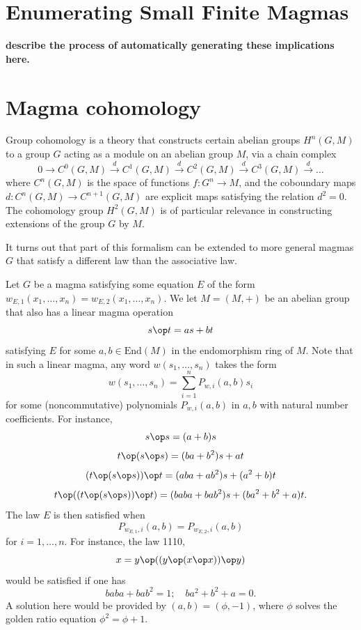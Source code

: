 \chapter{Enumerating Small Finite Magmas}\label{all-small-magmas-chapter}

{\bf describe the process of automatically generating these implications here.}


\chapter{Magma cohomology}\label{cohomology-chapter}

Group cohomology is a theory that constructs certain abelian groups $H^n(G,M)$ to a group $G$ acting as a module on an abelian group $M$, via a chain complex
$$ 0 \to C^0(G,M) \stackrel{d}{\to} C^1(G,M) \stackrel{d}{\to} C^2(G,M) \stackrel{d}{\to} C^3(G,M) \stackrel{d}{\to} \dots$$
where $C^n(G,M)$ is the space of functions $f: G^n \to M$, and the coboundary maps $d: C^n(G,M) \to C^{n+1}(G,M)$ are explicit maps satisfying the relation $d^2=0$.  The cohomology group $H^2(G,M)$ is of particular relevance in constructing extensions of the group $G$ by $M$.

It turns out that part of this formalism can be extended to more general magmas $G$ that satisfy a different law than the associative law.

Let $G$ be a magma satisfying some equation $E$ of the form $w_{E,1}(x_1,\dots,x_n) = w_{E,2}(x_1,\dots,x_n)$.  We let $M = (M,+)$ be an abelian group that also has a linear magma operation
$$ s \op t = as + bt$$
satisfying $E$ for some $a,b \in \mathrm{End}(M)$ in the endomorphism ring of $M$.    Note that in such a linear magma, any word $w(s_1,\dots,s_n)$ takes the form
$$ w(s_1,\dots,s_n) = \sum_{i=1}^n P_{w,i}(a,b) s_i$$
for some (noncommutative) polynomials $P_{w,i}(a,b)$ in $a,b$ with natural number coefficients.  For instance,
$$ s \op s = (a+b) s$$
$$ t \op (s \op s) = (ba+b^2) s + at$$
$$ (t \op (s \op s)) \op t = (aba+ab^2) s + (a^2+b)t$$
$$ t \op ((t \op (s \op s)) \op t) = (baba+bab^2) s + (ba^2+b^2+a)t.$$
The law $E$ is then satisfied when
$$ P_{w_{E,1},i}(a,b)= P_{w_{E,2},i}(a,b)$$
for $i=1,\dots,n$.  For instance, the law 1110,
\begin{equation}\label{1110}
  x = y \op ((y \op (x \op x)) \op y)
\end{equation}
would be satisfied if one has
\begin{equation}\label{baba}
 baba+bab^2 = 1; \quad ba^2+b^2+a = 0.
\end{equation}
A solution here would be provided by $(a,b) = (\phi,-1)$, where $\phi$ solves the golden ratio equation $\phi^2 = \phi + 1$.

